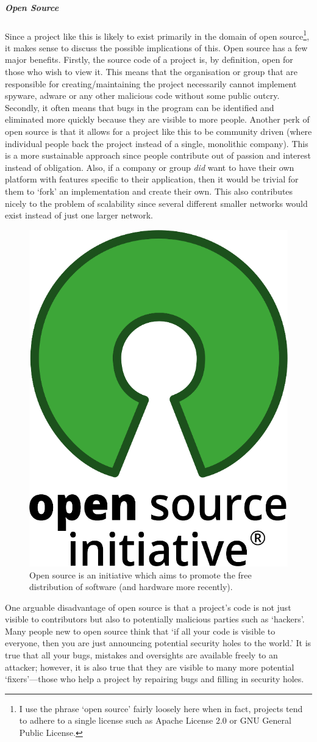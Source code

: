 \documentclass{article}
\begin{document}
\subparagraph{Open Source}
Since a project like this is likely to exist primarily in the domain of open source\footnote{I use the phrase `open source' fairly loosely here when in fact, projects tend to adhere to a single license such as Apache License 2.0 or GNU General Public License.}, it makes sense to discuss the possible implications of this. Open source has a few major benefits. Firstly, the source code of a project is, by definition, open for those who wish to view it. This means that the organisation or group that are responsible for creating/maintaining the project necessarily cannot implement spyware, adware or any other malicious code without some public outcry. Secondly, it often means that bugs in the program can be identified and eliminated more quickly because they are visible to more people. Another perk of open source is that it allows for a project like this to be community driven (where individual people back the project instead of a single, monolithic company). This is a more sustainable approach since people contribute out of passion and interest instead of obligation. Also, if a company or group \textit{did} want to have their own platform with features specific to their application, then it would be trivial for them to `fork' an implementation and create their own. This also contributes nicely to the problem of scalability since several different smaller networks would exist instead of just one larger network.
\begin{figure}[H]
    \centering
    \includegraphics[width=0.3\linewidth]{Images/opensource.png}
    \caption{Open source is an initiative which aims to promote the free distribution of software (and hardware more recently).}
    \label{fig:osi}
\end{figure}
One arguable disadvantage of open source is that a project's code is not just visible to contributors but also to potentially malicious parties such as `hackers'. Many people new to open source think that `if all your code is visible to everyone, then you are just announcing potential security holes to the world.' It is true that all your bugs, mistakes and oversights are available freely to an attacker; however, it is also true that they are visible to many more potential `fixers'---those who help a project by repairing bugs and filling in security holes.
\end{document}
